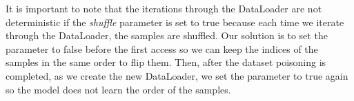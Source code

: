 It is important to note that the iterations through the DataLoader are not deterministic if the \textit{shuffle} parameter is set to true because each time we iterate through the DataLoader, the samples are shuffled. Our solution is to set the parameter to false before the first access so we can keep the indices of the samples in the same order to flip them. Then, after the dataset poisoning is completed, as we create the new DataLoader, we set the parameter to true again so the model does not learn the order of the samples.


